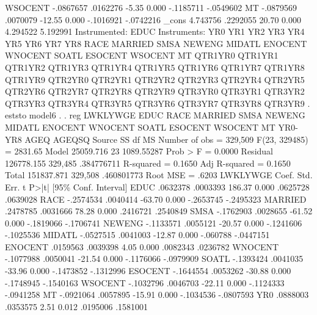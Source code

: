      WSOCENT {\VBAR}  -.0867657   .0162276    -5.35   0.000    -.1185711   -.0549602
          MT {\VBAR}  -.0879569   .0070079   -12.55   0.000    -.1016921   -.0742216
       _cons {\VBAR}   4.743756   .2292055    20.70   0.000     4.294522    5.192991
Instrumented:  EDUC
Instruments:   YR0 YR1 YR2 YR3 YR4 YR5 YR6 YR7 YR8 RACE MARRIED SMSA NEWENG
               MIDATL ENOCENT WNOCENT SOATL ESOCENT WSOCENT MT QTR1YR0
               QTR1YR1 QTR1YR2 QTR1YR3 QTR1YR4 QTR1YR5 QTR1YR6 QTR1YR7
               QTR1YR8 QTR1YR9 QTR2YR0 QTR2YR1 QTR2YR2 QTR2YR3 QTR2YR4
               QTR2YR5 QTR2YR6 QTR2YR7 QTR2YR8 QTR2YR9 QTR3YR0 QTR3YR1
               QTR3YR2 QTR3YR3 QTR3YR4 QTR3YR5 QTR3YR6 QTR3YR7 QTR3YR8
               QTR3YR9
{\smallskip}
. eststo model6
{\smallskip}
. 
. reg  LWKLYWGE EDUC  RACE MARRIED SMSA NEWENG MIDATL ENOCENT WNOCENT SOATL ESOCENT WSOCENT MT YR0-YR8 AGEQ AGEQSQ 
{\smallskip}
      Source {\VBAR}       SS           df       MS      Number of obs   =   329,509
   F(23, 329485)   =   2831.65
       Model {\VBAR}   25059.716        23  1089.55287   Prob > F        =    0.0000
    Residual {\VBAR}  126778.155   329,485  .384776711   R-squared       =    0.1650
   Adj R-squared   =    0.1650
       Total {\VBAR}  151837.871   329,508  .460801773   Root MSE        =     .6203
{\smallskip}
    LWKLYWGE {\VBAR}      Coef.   Std. Err.      t    P>|t|     [95\% Conf. Interval]
        EDUC {\VBAR}   .0632378   .0003393   186.37   0.000     .0625728    .0639028
        RACE {\VBAR}  -.2574534   .0040414   -63.70   0.000    -.2653745   -.2495323
     MARRIED {\VBAR}   .2478785   .0031666    78.28   0.000     .2416721    .2540849
        SMSA {\VBAR}  -.1762903   .0028655   -61.52   0.000    -.1819066   -.1706741
      NEWENG {\VBAR}  -.1133571   .0055121   -20.57   0.000    -.1241606   -.1025536
      MIDATL {\VBAR}  -.0527515   .0041003   -12.87   0.000     -.060788   -.0447151
     ENOCENT {\VBAR}   .0159563   .0039398     4.05   0.000     .0082343    .0236782
     WNOCENT {\VBAR}  -.1077988   .0050041   -21.54   0.000    -.1176066   -.0979909
       SOATL {\VBAR}  -.1393424   .0041035   -33.96   0.000    -.1473852   -.1312996
     ESOCENT {\VBAR}  -.1644554   .0053262   -30.88   0.000    -.1748945   -.1540163
     WSOCENT {\VBAR}  -.1032796   .0046703   -22.11   0.000    -.1124333   -.0941258
          MT {\VBAR}  -.0921064   .0057895   -15.91   0.000    -.1034536   -.0807593
         YR0 {\VBAR}   .0888003   .0353575     2.51   0.012     .0195006    .1581001
